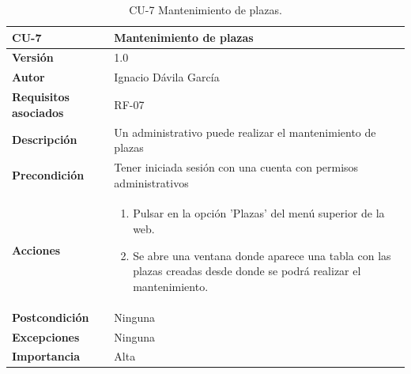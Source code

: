 \begin{table}[p]
	\centering
	\begin{tabularx}{\linewidth}{ p{} p{} }
		\toprule
		\textbf{CU-7}    & \textbf{Mantenimiento de plazas}\\
		\toprule
		\textbf{Versión}              & 1.0    \\
		\textbf{Autor}                & Ignacio Dávila García \\
		\textbf{Requisitos asociados} & RF-07 \\
		\textbf{Descripción}          & Un administrativo puede realizar el mantenimiento de plazas \\
		\textbf{Precondición}         & Tener iniciada sesión con una cuenta con permisos administrativos \\
		\textbf{Acciones}             &
		\begin{enumerate}
			\def\labelenumi{\arabic{enumi}.}
			\tightlist
			\item Pulsar en la opción 'Plazas' del menú superior de la web.
			\item Se abre una ventana donde aparece una tabla con las plazas creadas desde donde se podrá realizar el mantenimiento.
		\end{enumerate}\\
		\textbf{Postcondición}        & Ninguna \\
		\textbf{Excepciones}          & Ninguna \\
		\textbf{Importancia}          & Alta \\
		\bottomrule
	\end{tabularx}
	\caption{CU-7 Mantenimiento de plazas.}
\end{table}

